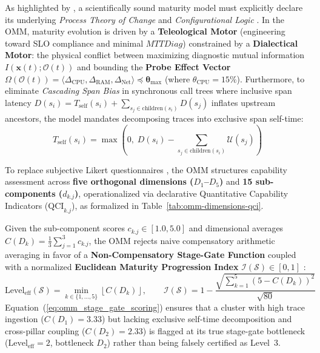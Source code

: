 As highlighted by , a scientifically sound maturity model must explicitly declare its underlying \textit{Process Theory of Change} \cite{vandeven_1995} and \textit{Configurational Logic} \cite{fiss_2011, vansteenbergen_2010}. In the OMM, maturity evolution is driven by a \textbf{Teleological Motor} (engineering toward SLO compliance and minimal $MTTDiag$) constrained by a \textbf{Dialectical Motor}: the physical conflict between maximizing diagnostic mutual information $I(\mathbf{x}(t); \mathcal{O}(t))$ and bounding the \textbf{Probe Effect Vector} $\Omega(\mathcal{O}(t)) = \langle \Delta_{\text{CPU}}, \Delta_{\text{RAM}}, \Delta_{\text{Net}} \rangle \preceq \boldsymbol{\theta}_{\max}$ (where $\theta_{\text{CPU}} = 15\%$). Furthermore, to eliminate \textit{Cascading Span Bias} in synchronous call trees where inclusive span latency $D(s_i) = T_{\text{self}}(s_i) + \sum_{s_j \in \text{children}(s_i)} D(s_j)$ inflates upstream ancestors, the model mandates decomposing traces into exclusive span self-time:
\begin{equation}
    T_{\text{self}}(s_i) = \max\left(0, \; D(s_i) - \sum_{s_j \in \text{children}(s_i)} \mathcal{U}(s_j)\right)
    \label{eq:omm_exclusive_selftime}
\end{equation}

To replace subjective Likert questionnaires \cite{proenca_2016_rcis}, the OMM structures capability assessment across \textbf{five orthogonal dimensions ($D_1$--$D_5$)} and \textbf{15 sub-components ($d_{k.j}$)}, operationalized via declarative Quantitative Capability Indicators ($\text{QCI}_{k.j}$), as formalized in Table~\ref{tab:omm-dimensions-qci}.



Given the sub-component scores $c_{k.j} \in [1.0, 5.0]$ and dimensional averages $C(D_k) = \frac{1}{3}\sum_{j=1}^3 c_{k.j}$, the OMM rejects naive compensatory arithmetic averaging in favor of a \textbf{Non-Compensatory Stage-Gate Function} coupled with a normalized \textbf{Euclidean Maturity Progression Index} $\mathcal{I}(\mathcal{S}) \in [0, 1]$ \cite{debruin_2005, lasrado_2015}:
\begin{equation}
    \text{Level}_{\text{eff}}(\mathcal{S}) = \min_{k \in \{1, \dots, 5\}} \left\lfloor C(D_k) \right\rfloor, \qquad \mathcal{I}(\mathcal{S}) = 1 - \frac{\sqrt{\sum_{k=1}^{5} \left(5 - C(D_k)\right)^2}}{\sqrt{80}}
    \label{eq:omm_stage_gate_scoring}
\end{equation}
Equation~(\ref{eq:omm_stage_gate_scoring}) ensures that a cluster with high trace ingestion ($C(D_1) = 3.33$) but lacking exclusive self-time decomposition and cross-pillar coupling ($C(D_2) = 2.33$) is flagged at its true stage-gate bottleneck ($\text{Level}_{\text{eff}} = 2$, bottleneck $D_2$) rather than being falsely certified as Level~3.

